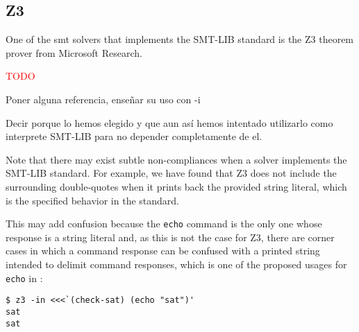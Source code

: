 \subsection{Z3}

One of the \acrshort{smt} solvers that implements the SMT-LIB standard is the
Z3 theorem prover from Microsoft Research.

\textcolor{red}{TODO}

Poner alguna referencia, enseñar su uso con -i

Decir porque lo hemos elegido y que aun así hemos intentado utilizarlo como 
interprete SMT-LIB para no depender completamente de el.

Note that there may exist subtle non-compliances when a solver implements the
SMT-LIB standard. For example, we have found that Z3 does not include the
surrounding double-quotes when it prints back the provided string literal,
which is the specified behavior in the standard.

This may add confusion because the \verb|echo| command is the only one whose
response is a string literal and, as this is not the case for Z3, there are 
corner cases in which a command response can be confused with a printed string
intended to delimit command responses, which is one of the proposed usages for
\verb|echo| in \cite{smtLibStandard}:

\begin{verbatim}
$ z3 -in <<<`(check-sat) (echo "sat")'
sat
sat
\end{verbatim}
